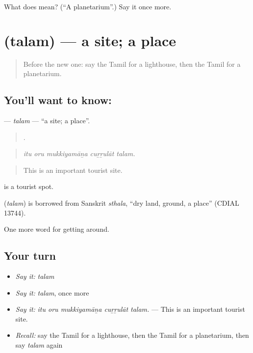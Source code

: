 \begin{tcolorbox}[breakable,colback=teal!4,colframe=teal!35!black,title={Before you move on}]
What does  mean? (\textquotedblleft{}A planetarium\textquotedblright{}.) Say it once more.
\end{tcolorbox}
\section[\texorpdfstring{\ta{தலம்} (talam)}{தலம் (talam)}]{ (talam) — a site; a place}

\label{lesson:TA-C425-talam}



\begin{quote}
Before the new one: say the Tamil for a lighthouse, then the Tamil for a planetarium.
\end{quote}

\subsection*{You'll want to know: }
\textbf{} — \emph{talam} — \textquotedblleft{}a site; a place\textquotedblright{}.

\begin{quote}
    .
\end{quote}

\begin{quote}
\emph{itu oru mukkiyamāṉa cuṟṟulāt talam.}
\end{quote}

\begin{quote}
This is an important tourist site.
\end{quote}

  is a tourist spot.

\begin{cousinweb}
\textbf{} (\emph{talam}) is borrowed from Sanskrit \emph{sthala}, \textquotedblleft{}dry land, ground, a place\textquotedblright{} (CDIAL 13744).
\end{cousinweb}

\begin{grammarlens}[title={What you've built}]
One more word for getting around.
\end{grammarlens}

\subsection*{Your turn}
\begin{itemize}
\raggedright
  \item \emph{Say it:} \emph{talam}
  \item \emph{Say it:} \emph{talam}, once more
  \item \emph{Say it:} \emph{itu oru mukkiyamāṉa cuṟṟulāt talam.} — This is an important tourist site.
  \item \emph{Recall:} say the Tamil for a lighthouse, then the Tamil for a planetarium, then say \emph{talam} again
\end{itemize}

